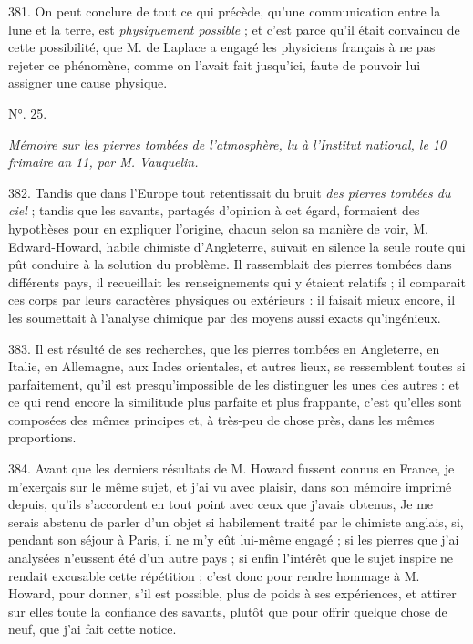 \documentclass[a4paper, 11pt, oneside, polutonikogreek, french]{article}
\begin{document}
381. On peut conclure de tout ce qui précède, qu'une communication entre la lune et la terre, est \emph{physiquement possible} ; et c'est parce qu'il était convaincu de cette possibilité, que M. de Laplace a engagé les physiciens français à ne pas rejeter ce phénomène, comme on l'avait fait jusqu'ici, faute de pouvoir lui assigner une cause physique.

\begin{center}
N°. 25.
\end{center}

\emph{Mémoire sur les pierres tombées de l'atmosphère, lu à l'Institut national, le 10 frimaire an 11, par M. Vauquelin.}

382. Tandis que dans l'Europe tout retentissait du bruit \emph{des pierres tombées du ciel} ; tandis que les savants, partagés d'opinion à cet égard, formaient des hypothèses pour en expliquer l'origine, chacun selon sa manière de voir, M. Edward-Howard, habile chimiste d'Angleterre, suivait en silence la seule route qui pût conduire à la solution du problème. Il rassemblait des pierres tombées dans différents pays, il recueillait les renseignements qui y étaient relatifs ; il comparait ces corps par leurs caractères physiques ou extérieurs : il faisait mieux encore, il les soumettait à l'analyse chimique par des moyens aussi exacts qu'ingénieux.

383. Il est résulté de ses recherches, que les pierres tombées en Angleterre, en Italie, en Allemagne, aux Indes orientales, et autres lieux, se ressemblent toutes si parfaitement, qu'il est presqu'impossible de les distinguer les unes des autres : et ce qui rend encore la similitude plus parfaite et plus frappante, c'est qu'elles sont composées des mêmes principes et, à très-peu de chose près, dans les mêmes proportions.

384. Avant que les derniers résultats de M. Howard fussent connus en France, je m'exerçais sur le même sujet, et j'ai vu avec plaisir, dans son mémoire imprimé depuis, qu'ils s'accordent en tout point avec ceux que j'avais obtenus, Je me serais abstenu de parler d'un objet si habilement traité par le chimiste anglais, si, pendant son séjour à Paris, il ne m'y eût lui-même engagé ; si les pierres que j'ai analysées n'eussent été d'un autre pays ; si enfin l'intérêt que le sujet inspire ne rendait excusable cette répétition ; c'est donc pour rendre hommage à M. Howard, pour donner, s'il est possible, plus de poids à ses expériences, et attirer sur elles toute la confiance des savants, plutôt que pour offrir quelque chose de neuf, que j'ai fait cette notice.
\end{document}
